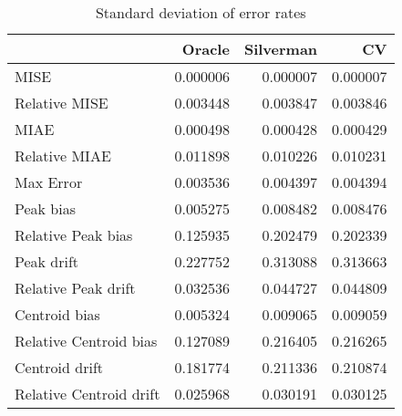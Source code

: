 \begin{table}[H]
\centering
\begin{tabular}{lrrr}
  \hline
 & Oracle & Silverman & CV \\ 
  \hline
MISE & 0.000006 & 0.000007 & 0.000007 \\ 
  Relative MISE & 0.003448 & 0.003847 & 0.003846 \\ 
  MIAE & 0.000498 & 0.000428 & 0.000429 \\ 
  Relative MIAE & 0.011898 & 0.010226 & 0.010231 \\ 
  Max Error & 0.003536 & 0.004397 & 0.004394 \\ 
  Peak bias & 0.005275 & 0.008482 & 0.008476 \\ 
  Relative Peak bias & 0.125935 & 0.202479 & 0.202339 \\ 
  Peak drift & 0.227752 & 0.313088 & 0.313663 \\ 
  Relative Peak drift & 0.032536 & 0.044727 & 0.044809 \\ 
  Centroid bias & 0.005324 & 0.009065 & 0.009059 \\ 
  Relative Centroid bias & 0.127089 & 0.216405 & 0.216265 \\ 
  Centroid drift & 0.181774 & 0.211336 & 0.210874 \\ 
  Relative Centroid drift & 0.025968 & 0.030191 & 0.030125 \\ 
   \hline
\end{tabular}
\caption{Standard deviation of error rates} 
\label{tbl:stddev_error_rates}
\end{table}
